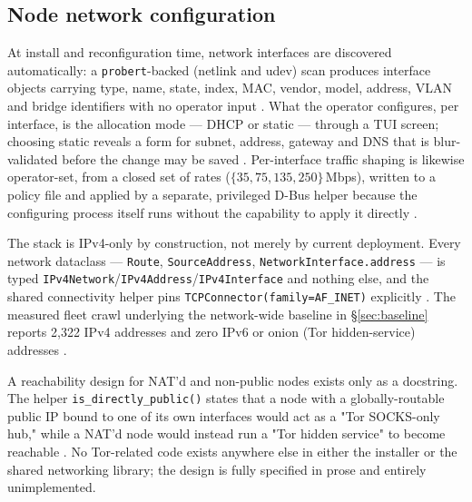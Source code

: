 \subsection{Node network configuration}
\label{sec:networking-nodeconfig}

At install and reconfiguration time, network interfaces are discovered automatically: a
\texttt{probert}-backed (netlink and udev) scan produces interface objects carrying type, name,
state, index, MAC, vendor, model, address, VLAN and bridge identifiers with no operator input
.
What the operator configures, per interface, is the allocation mode — DHCP or static — through a
TUI screen; choosing static reveals a form for subnet, address, gateway and DNS that is
blur-validated before the change may be saved
.
Per-interface traffic shaping is likewise operator-set, from a closed set of rates
($\{35,75,135,250\}$\,Mbps), written to a policy file and applied by a separate, privileged D-Bus
helper because the configuring process itself runs without the capability to apply it directly
.
\shipped

The stack is IPv4-only by construction, not merely by current deployment. Every network dataclass
— \texttt{Route}, \texttt{SourceAddress}, \texttt{NetworkInterface.\allowbreak{}address} — is typed
\texttt{IPv4Network}\slash\texttt{IPv4Address}\slash\texttt{IPv4Interface} and nothing else, and the shared
connectivity helper pins \texttt{TCPConnector(family=\allowbreak{}AF\_INET)} explicitly
. The
measured fleet crawl underlying the network-wide baseline in \S\ref{sec:baseline} reports
2{,}322 IPv4 addresses and zero IPv6 or onion (Tor hidden-service) addresses
. \shipped

A reachability design for NAT'd and non-public nodes exists only as a docstring. The helper
\texttt{is\_directly\_public()} states that a node with a globally-routable public IP bound to one
of its own interfaces would act as a "Tor SOCKS-only hub," while a NAT'd node would instead run a
"Tor hidden service" to become reachable
.
No Tor-related code exists anywhere else in either the installer or the shared networking library;
the design is fully specified in prose and entirely unimplemented. \vision

